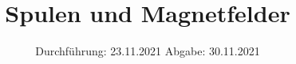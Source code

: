 

\subject{VERSUCH NUMMER}
\title{Spulen und Magnetfelder}
\date{%
  Durchführung: 23.11.2021
  \hspace{3em}
  Abgabe: 30.11.2021
}



\maketitle
\thispagestyle{empty}
\tableofcontents
\newpage







\printbibliography{}


